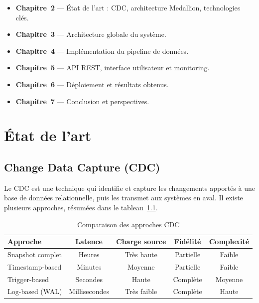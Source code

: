 \documentclass[12pt,a4paper]{report}
\begin{document}
\begin{itemize}[leftmargin=2cm]
    \item \textbf{Chapitre~2} --- État de l'art : CDC, architecture Medallion,
          technologies clés.
    \item \textbf{Chapitre~3} --- Architecture globale du système.
    \item \textbf{Chapitre~4} --- Implémentation du pipeline de données.
    \item \textbf{Chapitre~5} --- API REST, interface utilisateur et monitoring.
    \item \textbf{Chapitre~6} --- Déploiement et résultats obtenus.
    \item \textbf{Chapitre~7} --- Conclusion et perspectives.
\end{itemize}

\chapter{État de l'art}

\section{Change Data Capture (CDC)}

Le CDC est une technique qui identifie et capture les changements apportés à
une base de données relationnelle, puis les transmet aux systèmes en aval. Il
existe plusieurs approches, résumées dans le tableau~\ref{tab:cdc_compare}.

\begin{table}[h]
\centering
\caption{Comparaison des approches CDC}
\label{tab:cdc_compare}
\renewcommand{\arraystretch}{1.3}
\begin{tabular}{lcccc}
\toprule
\textbf{Approche} & \textbf{Latence} & \textbf{Charge source}
                  & \textbf{Fidélité} & \textbf{Complexité} \\
\midrule
Snapshot complet   & Heures      & Très haute & Partielle & Faible  \\
Timestamp-based    & Minutes     & Moyenne    & Partielle & Faible  \\
Trigger-based      & Secondes    & Haute      & Complète  & Moyenne \\
Log-based (WAL)    & Millisecondes & Très faible & Complète & Haute  \\
\bottomrule
\end{tabular}
\end{table}
\end{document}

